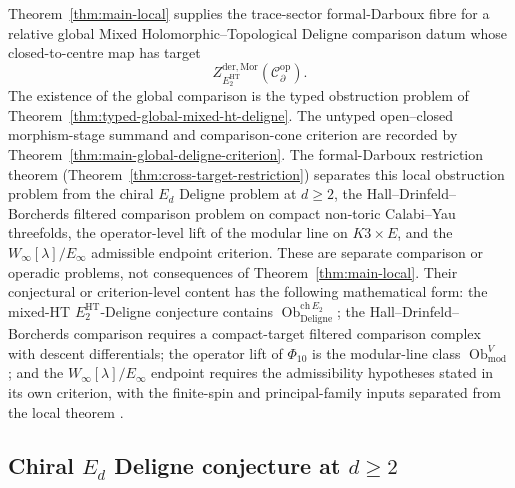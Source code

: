 \documentclass[11pt]{memoir}
\begin{document}
Theorem~\ref{thm:main-local} supplies the trace-sector formal-Darboux
fibre for a relative global Mixed Holomorphic--Topological Deligne
comparison datum whose closed-to-centre map has target
\[
  Z^{\mathrm{der},\mathrm{Mor}}_{E_2^{\mathrm{HT}}}\!
    (\mathcal{C}^{\mathrm{op}}_\partial).
\]
The existence of the global comparison is the typed obstruction problem
of Theorem~\ref{thm:typed-global-mixed-ht-deligne}.  The untyped
open--closed morphism-stage summand and comparison-cone criterion are
recorded by Theorem~\ref{thm:main-global-deligne-criterion}.  The
formal-Darboux restriction theorem
(Theorem~\ref{thm:cross-target-restriction}) separates this local
obstruction problem from the chiral \(E_d\) Deligne problem at
\(d\geq 2\), the Hall--Drinfeld--Borcherds filtered comparison problem
on compact non-toric Calabi--Yau threefolds, the operator-level lift of
the modular line on \(K3\times E\), and the
\(W_\infty[\lambda]/E_\infty\) admissible endpoint criterion.  These
are separate comparison or operadic problems, not consequences of
Theorem~\ref{thm:main-local}.  Their conjectural or criterion-level
content has the following mathematical form:
the mixed-HT \(E_2^{\mathrm{HT}}\)-Deligne conjecture contains
\(\operatorname{Ob}^{\mathrm{ch}\,E_2}_{\mathrm{Deligne}}\); the
Hall--Drinfeld--Borcherds comparison requires a compact-target filtered
comparison complex with descent differentials; the operator lift of
\(\Phi_{10}\) is the modular-line class
\(\operatorname{Ob}^V_{\mathrm{mod}}\); and the
\(W_\infty[\lambda]/E_\infty\) endpoint requires the admissibility
hypotheses stated in its own criterion, with the finite-spin and
principal-family inputs separated from the local theorem
\cite{prochazka-w-infinity}\cite{creutzig-kanade-linshaw-coset}
\cite{pope-romans-shen}\cite{bakas-w-infinity}
\cite{arakawa-admissible-w}\cite{costello-paquette-twisted-holography}.

\subsection{Chiral
  \texorpdfstring{$E_d$}{Ed} Deligne conjecture at
  \texorpdfstring{$d\geq 2$}{d>=2}}\label{ssec:open-chiral-Ed-Deligne}
\end{document}
